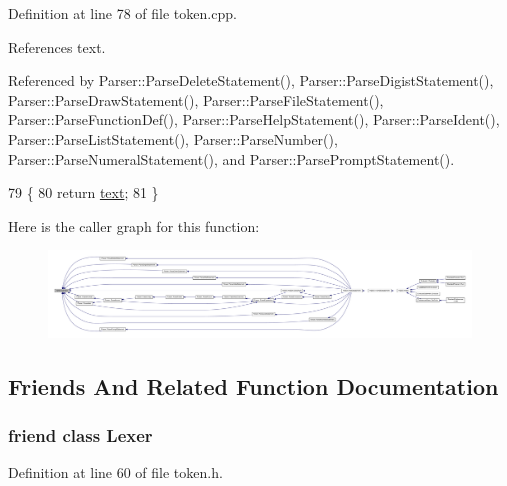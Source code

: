Definition at line 78 of file token.\+cpp.



References text.



Referenced by Parser\+::\+Parse\+Delete\+Statement(), Parser\+::\+Parse\+Digist\+Statement(), Parser\+::\+Parse\+Draw\+Statement(), Parser\+::\+Parse\+File\+Statement(), Parser\+::\+Parse\+Function\+Def(), Parser\+::\+Parse\+Help\+Statement(), Parser\+::\+Parse\+Ident(), Parser\+::\+Parse\+List\+Statement(), Parser\+::\+Parse\+Number(), Parser\+::\+Parse\+Numeral\+Statement(), and Parser\+::\+Parse\+Prompt\+Statement().


\begin{DoxyCode}
79 \{
80     \textcolor{keywordflow}{return} \hyperlink{structToken_ab2d6b41ba04b1a1e272d7e963303f8db}{text};
81 \}
\end{DoxyCode}


Here is the caller graph for this function\+:
\nopagebreak
\begin{figure}[H]
\begin{center}
\leavevmode
\includegraphics[width=350pt]{df/dcd/structToken_a15f1043de07ce8e452fbf115b85def71_icgraph}
\end{center}
\end{figure}




\subsection{Friends And Related Function Documentation}
\subsubsection[{\texorpdfstring{Lexer}{Lexer}}]{\setlength{\rightskip}{0pt plus 5cm}friend class {\bf Lexer}\hspace{0.3cm}{\ttfamily [friend]}}\hypertarget{structToken_a2e54c4809acbcd06c4bd4f186ad91584}{}\label{structToken_a2e54c4809acbcd06c4bd4f186ad91584}


Definition at line 60 of file token.\+h.



